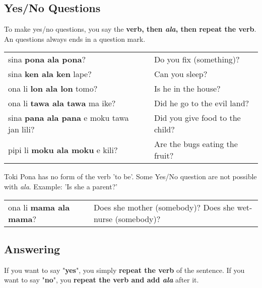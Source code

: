 \subsection*{Yes/No Questions}

To make yes/no questions, you say the \textbf{verb, then \textit{ala}, then repeat the verb}. 
An questions always ends in a question mark.

\begin{supertabular}{p{5,5cm}|ll}
sina \textbf{pona ala pona}? && Do you fix (something)? \\
sina \textbf{ken ala ken} lape? && Can you sleep? \\
ona li \textbf{lon ala lon} tomo? && Is he in the house? \\
ona li \textbf{tawa ala tawa} ma ike? && Did he go to the evil land? \\
sina \textbf{pana ala pana} e moku tawa jan lili? && Did you give food to the child? \\
pipi li \textbf{moku ala moku} e kili? && Are the bugs eating the fruit? \\
\end{supertabular} 

Toki Pona has no form of the verb 'to be'. Some Yes/No question are not possible with \textit{ala}. Example: 'Is she a parent?'

\begin{supertabular}{p{5,5cm}|ll}
ona li \textbf{mama ala mama}? && Does she mother (somebody)? Does she wet-nurse (somebody)?  \\
\end{supertabular} 
%
\subsection*{Answering}

If you want to say "\textbf{yes}", you simply \textbf{repeat the verb} of the sentence. 
If you want to say "\textbf{no}", you \textbf{repeat the verb and add \textit{ala}} after it. 

